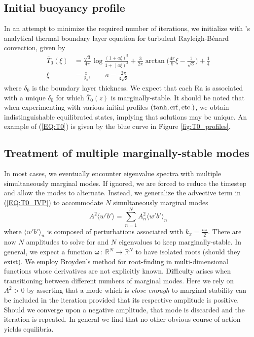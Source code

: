 \documentclass[reprint,amsmath,amssymb,aps]{revtex4-1}
\newcommand\Ra{\mathrm{Ra}}
\begin{document}
\subsection{Initial buoyancy profile} \label{sec:initial_profile}
In an attempt to minimize the required number of iterations, we initialize with \cite{Shishkina}'s analytical thermal boundary layer equation for turbulent Rayleigh-B\'enard convection, given by 
\begin{align}
    \bar{T}_0(\xi) &= \frac{\sqrt{3}}{4\pi} \log \frac{(1 + a\xi)^3}{1 + (a\xi)^3} + \frac{3}{2\pi} \arctan \Big( \frac{4\pi}{9}\xi - \frac{1}{\sqrt{3}} \Big) + \frac{1}{4} \nonumber \\
    \xi &= \frac{z}{\delta_0}, \qquad a = \frac{2\pi}{3\sqrt{3}}\label{EQ:T0}
\end{align}
where $\delta_0$ is the boundary layer thickness. We expect that each $\Ra$ is associated with a unique $\delta_0$ for which $\bar{T}_0(z)$ is marginally-stable. It should be noted that when experimenting with various initial profiles $(\tanh, \rm{erf}, \rm{etc.})$, we obtain indistinguishable equilibrated states, implying that solutions may be unique. An example of (\ref{EQ:T0}) is given by the blue curve in Figure \ref{fig:T0_profiles}.

\subsection{Treatment of multiple marginally-stable modes} \label{sec:multiple_modes}
In most cases, we eventually encounter eigenvalue spectra with multiple simultaneously marginal modes. If ignored, we are forced to reduce the timestep and allow the modes to alternate. Instead, we generalize the advective term in (\ref{EQ:T0_IVP}) to accommodate $N$ simultaneously marginal modes
\begin{equation}
    A^2 \langle w' b' \rangle = \sum_{n = 1}^{N} A^2_{n} \langle w' b' \rangle_{n}
\end{equation}
where  $\langle w' b' \rangle_{n}$ is composed of perturbations associated with $k_x = \frac{n\pi}{2}$. There are now $N$ amplitudes to solve for and $N$ eigenvalues to keep marginally-stable. In general, we expect a function $\mathbf{\omega} \, : \, \mathbb{R}^N \to  \mathbb{R}^N$ to have isolated roots (should they exist). We employ Broyden's method for root-finding in multi-dimensional functions whose derivatives are not explicitly known. Difficulty arises when transitioning between different numbers of marginal modes. Here we rely on $A^2 > 0$ by asserting that a mode which is \textit{close enough} to marginal-stability can be included in the iteration provided that its respective amplitude is positive. Should we converge upon a negative amplitude, that mode is discarded and the iteration is repeated. In general we find that no other obvious course of action yields equilibria.
\end{document}
